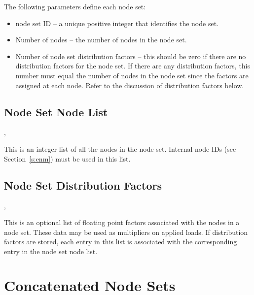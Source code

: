{The following parameters define each node set:}

\begin{itemize}
 \item {node set ID -- a unique positive integer that identifies the
 node set.}

 \item {Number of nodes -- the number of nodes in the node 
set.}

 \item {Number of node set distribution factors -- this should be zero
 if there are no distribution factors for the node set. If there are
 any distribution factors, this number must equal the number of nodes
 in the node set since the factors are assigned at each node. Refer to
 the discussion of distribution factors below.}
\end{itemize}



\subsection{Node Set Node List}

\begin{spacing}{1.5}
\api {}, 
\end{spacing}

{This is an integer list of all the nodes in the node set. Internal
node IDs (see Section~\ref{s:enm}) must be used in this list.}



\subsection{Node Set Distribution Factors}

\begin{spacing}{1.5}
\api {}, 
\end{spacing}

{This is an optional list of floating point factors associated with
the nodes in a node set. These data may be used as multipliers on
applied loads. If distribution factors are stored, each entry in this
list is associated with the corresponding entry in the node set node
list.}


\section{Concatenated Node Sets}

